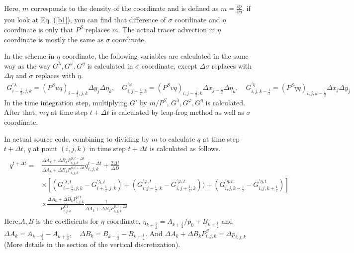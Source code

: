 Here, \(m\) corresponds to the density of the coordinate and is defined as \(m=\frac{\partial p}{\partial \eta}\). if you look at Eq. (\ref{b1}), you can find that difference of
\(\sigma\) coordinate and \(\eta\) coordinate is only that \(P^{S}\) replaces \(m\). The actual tracer advection in \(\eta\) coordinate is mostly the same as \(\sigma\) coordinate.

In the scheme in \(\eta\) coordinate, the following variables are calculated in the same way as the way \(G^{\lambda}, G^{\varphi}, G^{\eta}\) is calculated in \(\sigma\) coordinate, except
\(\Delta \sigma\) replaces with \(\Delta \eta\) and \(\dot{\sigma}\) replaces with \(\dot{\eta}\).
\begin{eqnarray}G^{\prime \lambda}_{i-\frac{1}{2},j,k}=(P^{S}uq)_{i-\frac{1}{2},j,k} \Delta y_{j} \Delta \eta_{k},\quad G^{\prime \varphi}_{i,j-\frac{1}{2},k}=(P^{S}vq)_{i,j-\frac{1}{2},k} \Delta x_{j-\frac{1}{2}} \Delta \eta_{k},\quad G^{\prime \eta}_{i,j,k-\frac{1}{2}}=(P^{S} \dot{\eta} q)_{i,j,k-\frac{1}{2}} \Delta x_{j} \Delta y_{j}\end{eqnarray}
In the time integration step, multiplying \(G\prime\) by \(m/P^{S}\), \(G^{\lambda}, G^{\varphi}, G^{\eta}\) is calculated. After that, \(mq\) at time step \(t+\Delta t\) is calculated by leap-frog
method as well as \(\sigma\) coordinate.

In actual source code, combining to dividing by \(m\) to calculate \(q\) at time step \(t+\Delta t\), \(q\) at point \((i,j,k)\) in time step \(t+\Delta t\) is calculated as follows. \begin{eqnarray}\begin{split}
        q^{t+\Delta t}=&\frac{\Delta A_{k}+\Delta B_{k} P^{S,t-\Delta t}_{i,j,k}}{\Delta A_{k}+\Delta B_{k} P^{S,t+\Delta t}_{i,j,k}}q^{t-\Delta t}_{i,j,k}+\frac{2\Delta t}{\Delta D}\\
    &\times [(G^{\prime \lambda,t}_{i-\frac{1}{2},j,k}-G^{\prime \lambda,t}_{i+\frac{1}{2},j,k})+(G^{\prime \varphi,t}_{i,j-\frac{1}{2},k}-G^{\prime \varphi,t}_{i,j+\frac{1}{2},k}))+(G^{\prime \eta,t}_{i,j,k-\frac{1}{2}}-G^{\prime \eta,t}_{i,j,k+\frac{1}{2}})]\\
    &\times \frac{\Delta A_{k}+\Delta B_{k} P^{S,t}_{i,j,k}}{P^{S,t}_{i,j,k}}\frac{1}{\Delta A_{k}+\Delta B_{k} P^{S,t+\Delta t}_{i,j,k}}
  \end{split}\end{eqnarray} Here,\(A,B\) is the coefficients for \(\eta\) coordinate, \(\eta_{k+\frac{1}{2}}=A_{k+\frac{1}{2}}/p_{0}+B_{k+\frac{1}{2}}\) and
\(\Delta A_{k}=A_{k-\frac{1}{2}}-A_{k+\frac{1}{2}},\quad \Delta B_{k}=B_{k-\frac{1}{2}}-B_{k+\frac{1}{2}}\). And \(\Delta A_{k}+\Delta B_{k} P^{S}_{i,j,k}=\Delta p_{i,j,k}\)(More details in the
section of the vertical discretization).

